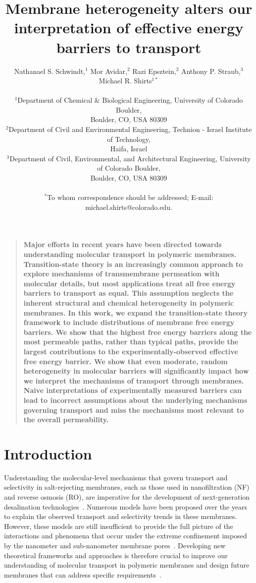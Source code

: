 \documentclass[12pt]{article}
\title{Membrane heterogeneity alters our interpretation of effective energy barriers to transport} %
\author
{Nathanael S. Schwindt,$^{1}$ Mor Avidar,$^{2}$ Razi Epsztein,$^{2}$ Anthony P. Straub,$^{3}$\\
Michael R. Shirts$^{1\ast}$\\
\\
\normalsize{$^{1}$Department of Chemical \& Biological Engineering, University of Colorado Boulder,}\\
\normalsize{Boulder, CO, USA 80309}\\
\normalsize{$^{2}$Department of Civil and Environmental Engineering, Technion - Israel Institute of Technology,}\\
\normalsize{Haifa, Israel}\\
\normalsize{$^{3}$Department of Civil, Environmental, and Architectural Engineering, University of Colorado Boulder,}\\
\normalsize{Boulder, CO, USA 80309}\\
\\
\normalsize{$^\ast$To whom correspondence should be addressed; E-mail:  michael.shirts@colorado.edu.}
}
\date{}
\newenvironment{sciabstract}{%
\begin{quote} \bf}
{\end{quote}}
\begin{document}
\baselineskip24pt

\maketitle 

\begin{sciabstract}
    Major efforts in recent years have been directed towards understanding molecular transport in polymeric membranes. Transition-state theory is an increasingly common approach to explore mechanisms of transmembrane permeation with molecular details, but most applications treat all free energy barriers to transport as equal. This assumption neglects the inherent structural and chemical heterogeneity in polymeric membranes. In this work, we expand the transition-state theory framework to include distributions of membrane free energy barriers. We show that the highest free energy barriers along the most permeable paths, rather than typical paths, provide the largest contributions to the experimentally-observed effective free energy barrier. We show that even moderate, random heterogeneity in molecular barriers will significantly impact how we interpret the mechanisms of transport through membranes. Naive interpretations of experimentally measured barriers can lead to incorrect assumptions about the underlying mechanisms governing transport and miss the mechanisms most relevant to the overall permeability. 
\end{sciabstract}

\clearpage
\pagebreak

\section*{Introduction}

Understanding the molecular-level mechanisms that govern transport and selectivity in salt-rejecting membranes, such as those used in nanofiltration (NF) and reverse osmosis (RO), are imperative for the development of next-generation desalination technologies~\cite{epsztein_towards_2020,faucher_critical_2019,epsztein_elucidating_2018}. Numerous models have been proposed over the years to explain the observed transport and selectivity trends in these membranes. However, these models are still insufficient to provide the full picture of the interactions and phenomena that occur under the extreme confinement imposed by the nanometer and sub-nanometer membrane pores~\cite{wang_pore_2021,yaroshchuk_non-steric_2001,biesheuvel_theory_2023,roy_framework_2019}. Developing new theoretical frameworks and approaches is therefore crucial to improve our understanding of molecular transport in polymeric membranes and design future membranes that can address specific requirements~\cite{zhao_differentiating_2021,duchanois_membrane_2021,duchanois_designing_2022}.  
\end{document}
